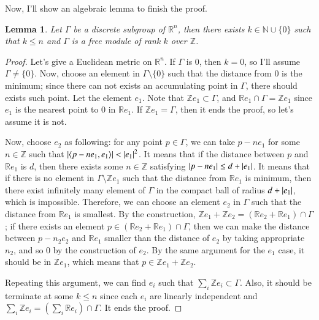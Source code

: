 \documentclass[a4paper, 12pt]{article}
\theoremstyle{Mydefinition}
\theoremstyle{Mytheorem}
\newtheorem{lemma}[statement]{Lemma}
\begin{document}
Now, I'll show an algebraic lemma to finish the proof.
\begin{lemma}
    Let $\Gamma$ be a discrete subgroup of $\mathbb{R}^n$, then there exists $k\in \mathbb{N}\cup \{0\}$ such that $k\leq n$ and $\Gamma$ is a free module of rank $k$ over $\mathbb{Z}$.
\end{lemma}
\begin{proof}
    Let's give a Euclidean metric on $\mathbb{R}^n$. If $\Gamma$ is $0$, then $k=0$, so I'll assume $\Gamma\neq \{0\}$. Now, choose an element in $\Gamma\setminus\{0\}$ such that the distance from $0$ is the minimum; since there can not exists an accumulating point in $\Gamma$, there should exists such point. Let the element $e_1$. Note that $\mathbb{Z}e_1\subset \Gamma$, and $\mathbb{R}e_1\cap \Gamma = \mathbb{Z}e_1$ since $e_1$ is the nearest point to $0$ in $\mathbb{R}e_1$. If $\mathbb{Z}e_1=\Gamma$, then it ends the proof, so let's assume it is not.
    
    Now, choose $e_2$ as following: for any point $p\in \Gamma$, we can take $p-ne_1$ for some $n\in \mathbb{Z}$ such that $\abs{\langle p-ne_1, e_1\rangle}<\abs{e_1}^2$. It means that if the distance between $p$ and $\mathbb{R}e_1$ is $d$, then there exists some $n\in\mathbb{Z}$ satisfying $\abs{p-ne_1}\leq d+\abs{e_1}$. It means that if there is no element in $\Gamma\setminus \mathbb{Z}e_1$ such that the distance from $\mathbb{R}e_1$ is minimum, then there exist infinitely many element of $\Gamma$ in the compact ball of radius $d+\abs{e_1}$, which is impossible. Therefore, we can choose an element $e_2$ in $\Gamma$ such that the distance from $\mathbb{R}e_1$ is smallest. By the construction, $\mathbb{Z}e_1+\mathbb{Z}e_2 = (\mathbb{R}e_2+\mathbb{R}e_1)\cap \Gamma$; if there exists an element $p\in (\mathbb{R}e_2+\mathbb{R}e_1)\cap \Gamma$, then we can make the distance between $p-n_2e_2$ and $\mathbb{R}e_1$ smaller than the distance of $e_2$ by taking appropriate $n_2$, and so $0$ by the construction of $e_2$. By the same argument for the $e_1$ case, it should be in $\mathbb{Z}e_1$, which means that $p\in \mathbb{Z}e_1+\mathbb{Z}e_2$.
    
    Repeating this argument, we can find $e_i$ such that $\sum_{i} \mathbb{Z}e_i\subset \Gamma$. Also, it should be terminate at some $k\leq n$ since each $e_i$ are linearly independent and $\sum_{i} \mathbb{Z}e_i = \left(\sum_{i} \mathbb{R}e_i\right)\cap \Gamma$. It ends the proof.
\end{proof}
\end{document}
